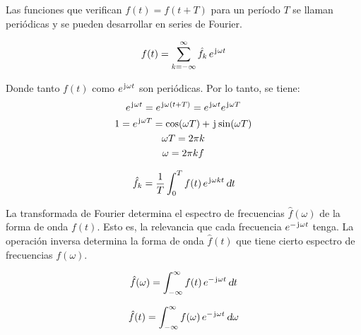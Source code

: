Las funciones que verifican $f(t)=f(t+T)$ para un período $T$ se llaman periódicas y se pueden desarrollar en series de Fourier.

\begin{mdframed}[style=DefinitionFrame]
    \begin{defn}
    \end{defn}
    \begin{equation*}
        f(t) = \sum_{k=-\infty}^{\infty} \hat{f}_k \, e^{\mkern2mu\mathrm{j}\mkern1mu \omega t}
    \end{equation*}
\end{mdframed}

Donde tanto $f(t)$ como $e^{\mkern2mu\mathrm{j}\mkern1mu \omega t}$ son periódicas.
Por lo tanto, se tiene:
\begin{gather*}
    e^{\mkern2mu\mathrm{j}\mkern1mu \omega t} = e^{\mkern2mu\mathrm{j}\mkern1mu \omega (t+T)} = e^{\mkern2mu\mathrm{j}\mkern1mu \omega t} e^{\mkern2mu\mathrm{j}\mkern1mu \omega T}
    \\
    1 = e^{\mkern2mu\mathrm{j}\mkern1mu \omega T} = \cos(\omega T) + \mkern2mu\mathrm{j}\mkern1mu \sin(\omega T)
    \\
    \omega T = 2 \pi k
    \\
    \omega = 2 \pi k f
\end{gather*}

\begin{mdframed}[style=PropertyFrame]
    \begin{prop}
    \end{prop}
    \begin{equation*}
        \hat{f}_k = \frac{1}{T} \int_0^T f(t) \, e^{\mkern2mu\mathrm{j}\mkern1mu \omega k t} \, \textsl{d} t
    \end{equation*}
\end{mdframed}

La transformada de Fourier determina el espectro de frecuencias $\hat{f}(\omega)$ de la forma de onda $f(t)$.
Esto es, la relevancia que cada frecuencia $e^{-\mkern2mu\mathrm{j}\mkern1mu \omega t}$ tenga.
La operación inversa determina la forma de onda $\hat{f}(t)$ que tiene cierto espectro de frecuencias $f(\omega)$.

\begin{mdframed}[style=DefinitionFrame]
    \begin{defn}
    \end{defn}
    \begin{equation*}
        \hat{f}(\omega) = \int_{-\infty}^{\infty} f(t) \, e^{-\mkern2mu\mathrm{j}\mkern1mu \omega t} \, \textsl{d} t
    \end{equation*}
\end{mdframed}

\begin{mdframed}[style=DefinitionFrame]
    \begin{defn}
    \end{defn}
    \begin{equation*}
        \hat{f}(t) = \int_{-\infty}^{\infty} f(\omega) \, e^{-\mkern2mu\mathrm{j}\mkern1mu \omega t} \, \textsl{d} \omega
    \end{equation*}
\end{mdframed}